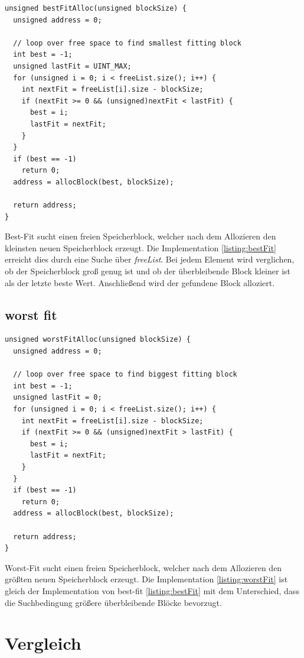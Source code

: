 \begin{lstlisting}[caption={best fit C-Implementation}, label=listing:bestFit]
unsigned bestFitAlloc(unsigned blockSize) {
  unsigned address = 0;

  // loop over free space to find smallest fitting block
  int best = -1;
  unsigned lastFit = UINT_MAX;
  for (unsigned i = 0; i < freeList.size(); i++) {
    int nextFit = freeList[i].size - blockSize;
    if (nextFit >= 0 && (unsigned)nextFit < lastFit) {
      best = i;
      lastFit = nextFit;
    }
  }
  if (best == -1)
    return 0;
  address = allocBlock(best, blockSize);

  return address;
}
\end{lstlisting}

Best-Fit sucht einen freien Speicherblock, welcher nach dem Allozieren den kleinsten neuen Speicherblock erzeugt. Die Implementation \ref{listing:bestFit} erreicht dies durch eine Suche über \textit{freeList}. Bei jedem Element wird verglichen, ob der Speicherblock groß genug ist und ob der überbleibende Block kleiner ist als der letzte beste Wert. Anschließend wird der gefundene Block alloziert.

\subsection{worst fit}

\begin{lstlisting}[caption={worst fit C-Implementation}, label=listing:worstFit]
unsigned worstFitAlloc(unsigned blockSize) {
  unsigned address = 0;

  // loop over free space to find biggest fitting block
  int best = -1;
  unsigned lastFit = 0;
  for (unsigned i = 0; i < freeList.size(); i++) {
    int nextFit = freeList[i].size - blockSize;
    if (nextFit >= 0 && (unsigned)nextFit > lastFit) {
      best = i;
      lastFit = nextFit;
    }
  }
  if (best == -1)
    return 0;
  address = allocBlock(best, blockSize);

  return address;
}
\end{lstlisting}

Worst-Fit sucht einen freien Speicherblock, welcher nach dem Allozieren den größten neuen Speicherblock erzeugt. Die Implementation \ref{listing:worstFit} ist gleich der Implementation von best-fit \ref{listing:bestFit} mit dem Unterschied, dass die Suchbedingung größere überbleibende Blöcke bevorzugt.

\section{Vergleich}

